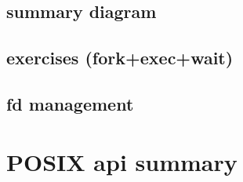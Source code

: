 


\subsection{summary diagram}




\subsection{exercises (fork+exec+wait)}



\subsection{fd management}



\section{POSIX api summary}

